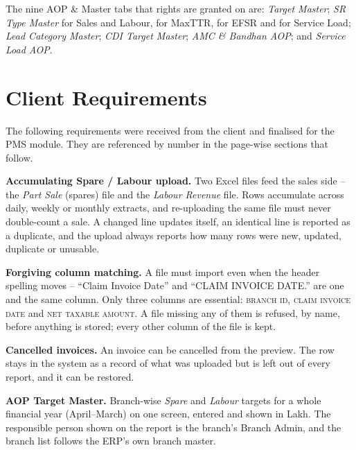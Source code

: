 \documentclass[11pt,a4paper]{article}
\newcommand{\col}[1]{\textsc{\small #1}}
\newcommand{\qt}[1]{\textquotedblleft #1\textquotedblright}
\begin{document}
The nine AOP \& Master tabs that rights are granted on are: \textit{Target Master};
\textit{SR Type Master} for Sales and Labour, for MaxTTR, for EFSR and for Service Load;
\textit{Lead Category Master}; \textit{CDI Target Master}; \textit{AMC \& Bandhan AOP};
and \textit{Service Load AOP}.

\section{Client Requirements}

The following requirements were received from the client and finalised for the PMS
module. They are referenced by number in the page-wise sections that follow.

\begin{reqlist}

\item \textbf{Accumulating Spare / Labour upload.} Two Excel files feed the sales side --
the \emph{Part Sale} (spares) file and the \emph{Labour Revenue} file. Rows accumulate
across daily, weekly or monthly extracts, and re-uploading the same file must never
double-count a sale. A changed line updates itself, an identical line is reported as a
duplicate, and the upload always reports how many rows were new, updated, duplicate or
unusable.

\item \textbf{Forgiving column matching.} A file must import even when the header
spelling moves -- \qt{Claim Invoice Date} and \qt{CLAIM  INVOICE DATE.} are one and the
same column. Only three columns are essential: \col{branch id},
\col{claim invoice date} and \col{net taxable amount}. A file missing any of them is
refused, by name, before anything is stored; every other column of the file is kept.

\item \textbf{Cancelled invoices.} An invoice can be cancelled from the preview. The row
stays in the system as a record of what was uploaded but is left out of every report,
and it can be restored.

\item \textbf{AOP Target Master.} Branch-wise \emph{Spare} and \emph{Labour} targets for a
whole financial year (April--March) on one screen, entered and shown in Lakh. The
responsible person shown on the report is the branch's Branch Admin, and the branch list
follows the ERP's own branch master.


\end{reqlist}
\end{document}

